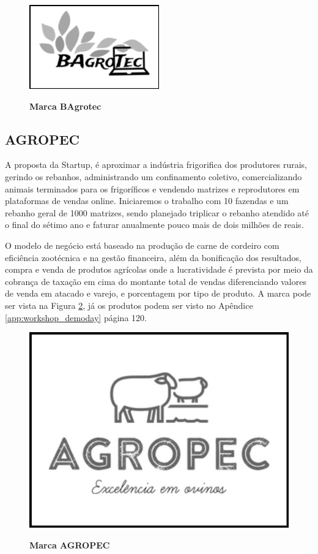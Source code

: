 \begin{figure}[H]
\centering
\caption{\textbf{Marca BAgrotec}}
\includegraphics[scale=0.9]{Imagens/bagrotec.png}
\label{figura_15}
\end{figure}


\subsection{AGROPEC}


A proposta da Startup, é aproximar a indústria frigorifica dos  produtores rurais, gerindo os rebanhos, administrando um 
confinamento coletivo, comercializando animais terminados para os frigoríficos e vendendo matrizes e reprodutores em plataformas de vendas online. Iniciaremos o trabalho com 10 fazendas e um rebanho geral de 1000 matrizes, sendo planejado triplicar o rebanho atendido até o final do sétimo ano e faturar anualmente pouco mais de dois milhões de reais.

O modelo de negócio está baseado na produção de carne de  cordeiro com eficiência zootécnica e na gestão financeira, além 
da bonificação dos resultados, compra e venda de produtos  agrícolas onde a lucratividade é prevista por meio da cobrança de taxação em cima do montante total de vendas diferenciando valores de venda em atacado e varejo, e porcentagem por tipo de produto. A marca pode ser vista na Figura \ref{figura_18}, já os produtos podem ser visto no Apêndice \ref{app:workshop_demoday} página 120.


\begin{figure}[H]
\centering
\caption{\textbf{Marca AGROPEC}}
\includegraphics[scale=0.2]{Imagens/agropec.jpg}
\label{figura_18}
\end{figure}

